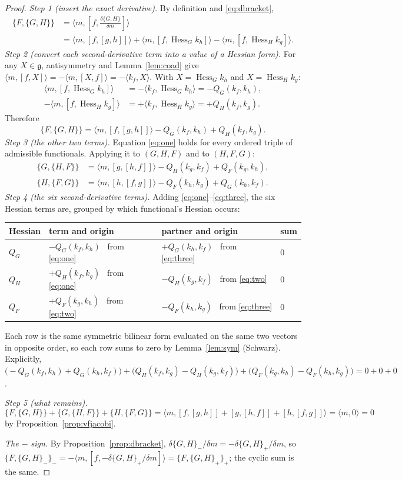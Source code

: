 \documentclass[11pt]{article}
\theoremstyle{definition}
\newcommand{\g}{\mathfrak{g}}
\newcommand{\ip}[2]{\langle #1,#2\rangle}
\newcommand{\Hess}{\operatorname{Hess}}
\begin{document}
\begin{proof}
\emph{Step 1 (insert the exact derivative).} By definition and \eqref{eq:dbracket},
\begin{align*}
\{F,\{G,H\}\}&=\ip m{[f,\tfrac{\delta\{G,H\}}{\delta m}]}\\
&=\ip m{[f,[g,h]]}+\ip m{[f,\Hess_Gk_h]}-\ip m{[f,\Hess_Hk_g]}.
\end{align*}
\emph{Step 2 (convert each second-derivative term into a value of a Hessian form).} For any
$X\in\g$, antisymmetry and Lemma~\ref{lem:coad} give $\ip m{[f,X]}=-\ip m{[X,f]}=-\ip{k_f}{X}$. With
$X=\Hess_Gk_h$ and $X=\Hess_Hk_g$:
\begin{align*}
\ip m{[f,\Hess_Gk_h]}&=-\ip{k_f}{\Hess_Gk_h}=-Q_G(k_f,k_h),\\
-\ip m{[f,\Hess_Hk_g]}&=+\ip{k_f}{\Hess_Hk_g}=+Q_H(k_f,k_g).
\end{align*}
Therefore
\begin{equation}\label{eq:one}
\{F,\{G,H\}\}=\ip m{[f,[g,h]]}-Q_G(k_f,k_h)+Q_H(k_f,k_g).
\end{equation}
\emph{Step 3 (the other two terms).} Equation \eqref{eq:one} holds for every ordered triple of
admissible functionals. Applying it to $(G,H,F)$ and to $(H,F,G)$:
\begin{align}
\{G,\{H,F\}\}&=\ip m{[g,[h,f]]}-Q_H(k_g,k_f)+Q_F(k_g,k_h),\label{eq:two}\\
\{H,\{F,G\}\}&=\ip m{[h,[f,g]]}-Q_F(k_h,k_g)+Q_G(k_h,k_f).\label{eq:three}
\end{align}
\emph{Step 4 (the six second-derivative terms).} Adding \eqref{eq:one}--\eqref{eq:three}, the six
Hessian terms are, grouped by which functional's Hessian occurs:
\begin{center}
\renewcommand{\arraystretch}{1.25}
\begin{tabular}{llll}\toprule
Hessian & term and origin & partner and origin & sum\\\midrule
$Q_G$ & $-Q_G(k_f,k_h)$ \ from \eqref{eq:one} & $+Q_G(k_h,k_f)$ \ from \eqref{eq:three} & $0$\\
$Q_H$ & $+Q_H(k_f,k_g)$ \ from \eqref{eq:one} & $-Q_H(k_g,k_f)$ \ from \eqref{eq:two} & $0$\\
$Q_F$ & $+Q_F(k_g,k_h)$ \ from \eqref{eq:two} & $-Q_F(k_h,k_g)$ \ from \eqref{eq:three} & $0$\\\bottomrule
\end{tabular}
\end{center}
Each row is the same symmetric bilinear form evaluated on the same two vectors in opposite order,
so each row sums to zero by Lemma~\ref{lem:sym} (Schwarz). Explicitly,
$\big(-Q_G(k_f,k_h)+Q_G(k_h,k_f)\big)+\big(Q_H(k_f,k_g)-Q_H(k_g,k_f)\big)+\big(Q_F(k_g,k_h)-Q_F(k_h,k_g)\big)=0+0+0$.

\emph{Step 5 (what remains).}
\[
\{F,\{G,H\}\}+\{G,\{H,F\}\}+\{H,\{F,G\}\}=\ip m{[f,[g,h]]+[g,[h,f]]+[h,[f,g]]}=\ip m0=0
\]
by Proposition~\ref{prop:vfjacobi}.

\emph{The $-$ sign.} By Proposition~\ref{prop:dbracket}, $\delta\{G,H\}_-/\delta m=-\delta\{G,H\}_+/\delta m$, so
$\{F,\{G,H\}_-\}_-=-\ip m{[f,-\delta\{G,H\}_+/\delta m]}=\{F,\{G,H\}_+\}_+$; the cyclic sum is the same.
\end{proof}
\end{document}
